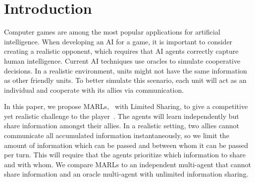 \section{Introduction}
Computer games are among the most popular applications for artificial intelligence. When developing an AI for a game, it is important to consider creating a realistic opponent, which requires that AI agents correctly capture human intelligence. Current AI techniques use oracles to simulate cooperative decisions. In a realistic environment, units might not have the same information as other friendly units. To better simulate this scenario, each unit will act as an individual and cooperate with its allies via communication.

In this paper, we propose MARLs, \MARL\ with Limited Sharing, to give a competitive yet realistic challenge to the player~\cite{Busoniu08CompSurvey}. The agents will learn independently but share information amongst their allies. In a realistic setting, two allies cannot communicate all accumulated information instantaneously, so we limit the amount of information which can be passed and between whom it can be passed per turn. This will require that the agents prioritize which information to share and with whom. We compare MARLs to an independent multi-agent that cannot share information and an oracle multi-agent with unlimited information sharing.

